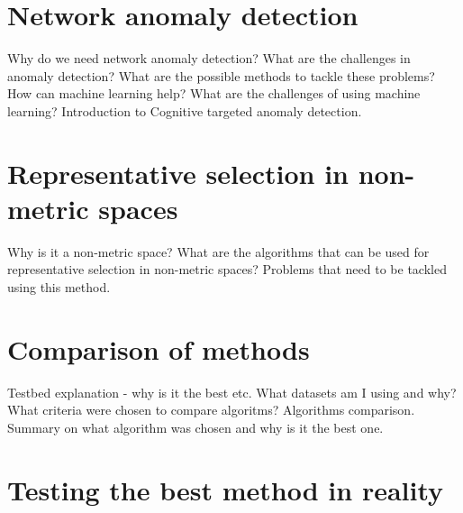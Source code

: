 \documentclass[thesis=B,english]{FITthesis}[2012/10/20]
\begin{document}
%




\chapter{Network anomaly detection}

Why do we need network anomaly detection?
What are the challenges in anomaly detection?
What are the possible methods to tackle these problems?
How can machine learning help? What are the challenges of using machine learning?
Introduction to Cognitive targeted anomaly detection.

\chapter{Representative selection in non-metric spaces}

Why is it a non-metric space?
What are the algorithms that can be used for representative selection in non-metric spaces?
Problems that need to be tackled using this method.

\chapter{Comparison of methods}

Testbed explanation - why is it the best etc.
What datasets am I using and why?
What criteria were chosen to compare algoritms?
Algorithms comparison.
Summary on what algorithm was chosen and why is it the best one.

\chapter{Testing the best method in reality}
\end{document}
